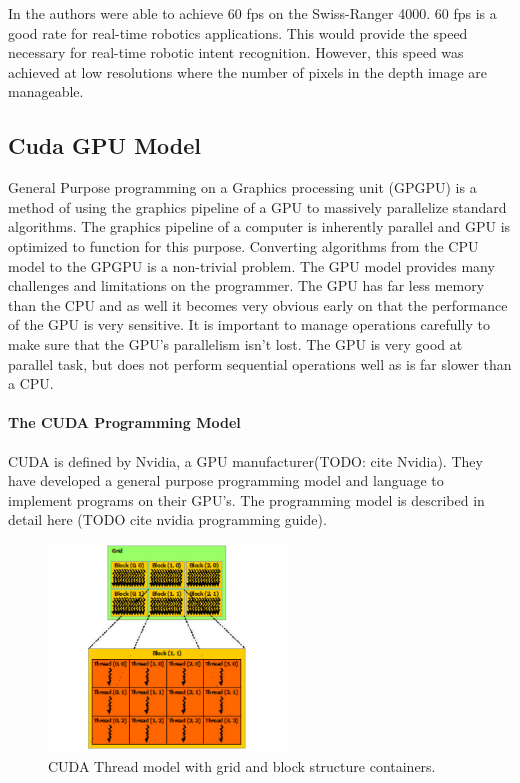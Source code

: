 \documentclass[conference]{IEEEtran}
\begin{document}
In \cite{Baak2011} the authors were able to achieve 60 fps on the Swiss-Ranger 4000. 60 fps is a good rate for real-time robotics applications. This would provide the speed necessary for real-time robotic intent recognition. However, this speed was achieved at low resolutions where the number of pixels in the depth image are manageable. 

\subsection{Cuda GPU Model}
\label{subsec:cudaModel}
General Purpose programming on a Graphics processing unit (GPGPU) is a method of using the graphics pipeline of a GPU to massively parallelize standard algorithms. The graphics pipeline of a computer is inherently parallel and GPU is optimized to function for this purpose. Converting algorithms from the CPU model to the GPGPU is a non-trivial problem. The GPU model provides many challenges and limitations on the programmer. The GPU has far less memory than the CPU and as well it becomes very obvious early on that the performance of the GPU is very sensitive. It is important to manage operations carefully to make sure that the GPU's parallelism isn't lost. The GPU is very good at parallel task, but does not perform sequential operations well as is far slower than a CPU.

\paragraph{The CUDA Programming Model} CUDA is defined by Nvidia\texttrademark, a GPU manufacturer(TODO: cite Nvidia). They have developed a general purpose programming model and language to implement programs on their GPU's. The programming model is described in detail here (TODO cite nvidia programming guide). 

\begin{figure}[!t]
\centering
\includegraphics[width=2.5in]{grid-of-thread-blocks}
\caption{CUDA Thread model with grid and block structure containers.}
\label{fig:gridthreadblocks}
\end{figure}
\end{document}
